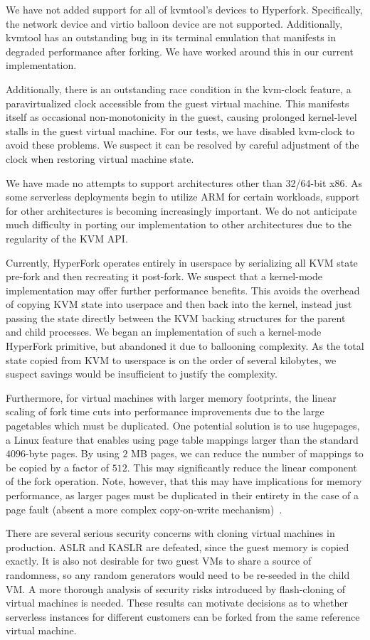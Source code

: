 We have not added support for all of kvmtool's devices to Hyperfork.
Specifically, the network device and virtio balloon device are not
supported. Additionally, kvmtool has an outstanding bug in its terminal
emulation that manifests in degraded performance after forking. We have worked
around this in our current implementation.

Additionally, there is an outstanding race condition in the kvm-clock feature,
a paravirtualized clock accessible from the guest virtual machine. This
manifests itself as occasional non-monotonicity in the guest, causing prolonged
kernel-level stalls in the guest virtual machine. For our tests, we have
disabled kvm-clock to avoid these problems. We suspect it can be resolved by
careful adjustment of the clock when restoring virtual machine state.

We have made no attempts to support architectures other than 32/64-bit x86. As
some serverless deployments begin to utilize ARM for certain workloads, support
for other architectures is becoming increasingly important. We do not
anticipate much difficulty in porting our implementation to other architectures
due to the regularity of the KVM API.

 Currently, HyperFork operates entirely in
userspace by serializing all KVM state pre-fork and then recreating it
post-fork. We suspect that a kernel-mode implementation may offer further
performance benefits. This avoids the overhead of copying KVM state into
userpace and then back into the kernel, instead just passing the state directly
between the KVM backing structures for the parent and child processes. We began
an implementation of such a kernel-mode HyperFork primitive, but abandoned it
due to ballooning complexity. As the total state copied from KVM to userspace
is on the order of several kilobytes, we suspect savings would be insufficient
to justify the complexity.

Furthermore, for virtual machines with larger memory footprints, the linear
scaling of fork time cuts into performance improvements due to the large
pagetables which must be duplicated. One potential solution is to use
hugepages, a Linux feature that enables using page table mappings larger than
the standard $4096$-byte pages. By using $2$ MB pages, we can reduce the number
of mappings to be copied by a factor of $512$. This may significantly reduce
the linear component of the fork operation. Note, however, that this may have
implications for memory performance, as larger pages must be duplicated in
their entirety in the case of a page fault (absent a more complex copy-on-write
mechanism)~\cite{hugepages}.

There are several serious security concerns with cloning virtual machines in
production. ASLR and KASLR are defeated, since the guest memory is copied
exactly. It is also not desirable for two guest VMs to share a source of
randomness, so any random generators would need to be re-seeded in the child
VM. A more thorough analysis of security risks introduced by flash-cloning of
virtual machines is needed. These results can motivate decisions as to whether
serverless instances for different customers can be forked from the same
reference virtual machine.
